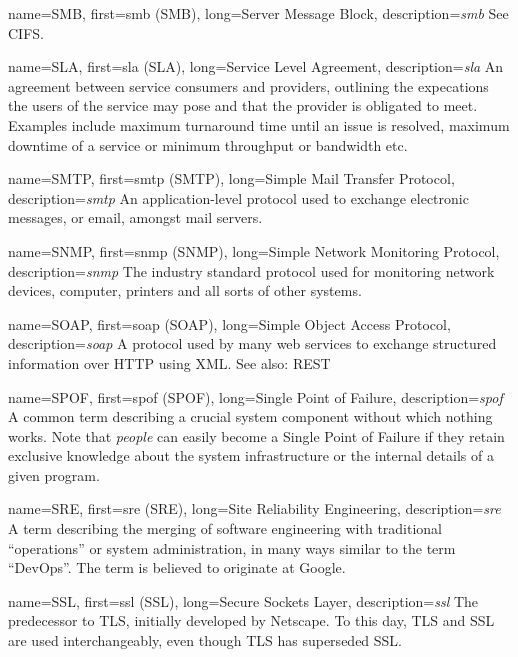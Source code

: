 {
	name={SMB},
	first={\acrlong{smb} (SMB)},
	long={Server Message Block},
	description={{\em \acrlong{smb}} See CIFS.}
}

{
	name={SLA},
	first={\acrlong{sla} (SLA)},
	long={Service Level Agreement},
	description={{\em \acrlong{sla}} An agreement between service
consumers and providers, outlining the expecations the users of the
service may pose and that the provider is obligated to meet.  Examples
include maximum turnaround time until an issue is resolved, maximum
downtime of a service or minimum throughput or
bandwidth etc.}
}

{
	name={SMTP},
	first={\acrlong{smtp} (SMTP)},
	long={Simple Mail Transfer Protocol},
	description={{\em \acrlong{smtp}} An application-level
protocol used to exchange electronic messages, or email, amongst mail
servers.}
}

{
	name={SNMP},
	first={\acrlong{snmp} (SNMP)},
	long={Simple Network Monitoring Protocol},
	description={{\em \acrlong{snmp}} The industry standard
protocol used for monitoring network devices, computer, printers and all
sorts of other systems.}
}

{
	name={SOAP},
	first={\acrlong{soap} (SOAP)},
	long={Simple Object Access Protocol},
	description={{\em \acrlong{soap}} A protocol used by many
web services to exchange structured information over HTTP using XML.  See
also: REST}
}

{
	name={SPOF},
	first={\acrlong{spof} (SPOF)},
	long={Single Point of Failure},
	description={{\em \acrlong{spof}} A common term describing a
crucial system component without which nothing works.  Note that
{\em people} can easily become a Single Point of Failure if they retain
exclusive knowledge about the system infrastructure or the internal
details of a given program.}
}

{
	name={SRE},
	first={\acrlong{sre} (SRE)},
	long={Site Reliability Engineering},
	description={{\em \acrlong{sre}} A term
describing the merging of software engineering with
traditional ``operations'' or system administration,
in many ways similar to the term ``DevOps''.  The term
is believed to originate at Google.
	}
}

{
	name={SSL},
	first={\acrlong{ssl} (SSL)},
	long={Secure Sockets Layer},
	description={{\em \acrlong{ssl}} The predecessor to TLS, initially
developed by Netscape.  To this day, TLS and SSL are used interchangeably,
even though TLS has superseded SSL.}
}

